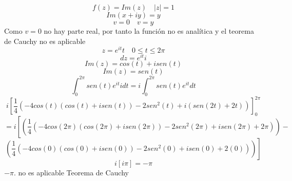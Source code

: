 \documentclass{article}
\begin{document}
\[
f(z)= Im(z) \quad |z|=1
\]
\begin{equation}
Im(x+iy)=y
\end{equation}
\begin{equation}
v=0 \quad v=y
\end{equation}
Como \( v=0\) no hay parte real, por tanto la función no es analítica y el teorema de Cauchy no es aplicable
\begin{equation}
z=e^{it}t \quad 0\leq t\leq 2\pi
\end{equation}
\begin{equation}
dz=e^{it}i
\end{equation}
\begin{equation}
Im(z)= cos(t)+i sen(t)
\end{equation}
\begin{equation}
Im(z)=  sen(t)
\end{equation}
\begin{equation}
\int_{0}^{2\pi}sen(t)e^{it}idt =i\int_{0}^{2\pi}sen(t)e^{it}dt
\end{equation}
\begin{equation}
i\left[ \frac{1}{4}\left( -4cos(t) (cos(t)+isen(t))-2sen^2(t)+i(sen(2t)+2t)\right)\right]_0^{2\pi}
\end{equation}
\begin{equation}
=i\left[ \left( \frac{1}{4}\left( -4cos(2\pi) (cos(2\pi)+isen(2\pi))-2sen^2(2\pi)+isen(2\pi)+2\pi \right) \right)- \right.
\end{equation}
\begin{equation}
\left. \left(\frac{1}{4}\left( -4cos(0) (cos(0)+isen(0))-2sen^2(0)+isen(0)+2(0)\right)\right)\right]
\end{equation}
\begin{equation}
i[i\pi]=-\pi
\end{equation}
\( -\pi\). no es aplicable Teorema de Cauchy 
\end{document}
